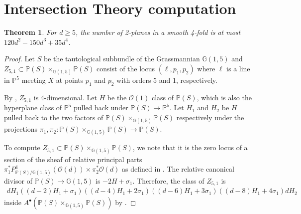 \documentclass[12pt,reqno]{amsart}
\theoremstyle{plain}
\newtheorem{theorem}{Theorem}[section]
\theoremstyle{remark}
\numberwithin{equation}{section}
\renewcommand{\to}{{\longrightarrow}}
\numberwithin{equation}{section}
\begin{document}
\section{Intersection Theory computation}
\label{sec:boundinghalfspaces}
\begin{theorem}
\label{thm:2planebound}
For $d\geq 5$, the number of 2-planes in a smooth 4-fold is at most $120 d^2 - 150 d^3 + 35 d^4$. 
\end{theorem}

\begin{proof}
Let $S$ be the tautological subbundle of the Grassmannian $\mathbb{G}(1,5)$ and $Z_{5,1}\subset \mathbb{P}(S)\times_{\mathbb{G}(1,5)}\mathbb{P}(S)$ consist of the locus $(\ell,p_1,p_2)$ where $\ell$ is a line in $\mathbb{P}^5$ meeting $X$ at points $p_1$ and $p_2$ with orders 5 and 1, respectively. 

By , $Z_{5,1}$ is 4-dimensional. Let $H$ be the  $\mathscr{O}(1)$ class of $\mathbb{P}(S)$, which is also the hyperplane class of $\mathbb{P}^5$ pulled back under $\mathbb{P}(S)\to \mathbb{P}^5$. Let $H_1$ and $H_2$ be $H$ pulled back to the two factors of $\mathbb{P}(S)\times_{\mathbb{G}(1,5)}\mathbb{P}(S)$ respectively under the projections $\pi_1,\pi_2: \mathbb{P}(S)\times_{\mathbb{G}(1,5)}\mathbb{P}(S)\to \mathbb{P}(S)$. 

To compute $Z_{5,1}\subset \mathbb{P}(S)\times_{\mathbb{G}(1,5)}\mathbb{P}(S)$, we note that it is the zero locus of a section of the sheaf of relative principal parts $\pi_1^{*}P_{\mathbb{P}(S)/\mathbb{G}(1,5)}^4(\mathscr{O}(d))\times \pi_2^{*}\mathscr{O}(d)$ as defined in \cite[Section 11.1.1]{3264}. The relative canonical divisor of $\mathbb{P}(S)\to \mathbb{G}(1,5)$ is $-2H+\sigma_1$. Therefore, the class of $Z_{5,1}$ is
\begin{align*}
    dH_1((d-2)H_1+\sigma_1)((d-4)H_1+2\sigma_1)((d-6)H_1+3\sigma_1)((d-8)H_1+4\sigma_1)dH_2
\end{align*}
inside $A^{\bullet}(\mathbb{P}(S)\times_{\mathbb{G}(1,5)}\mathbb{P}(S))$ by \cite[Theorem 11.2]{3264}.


\end{proof}
\end{document}
